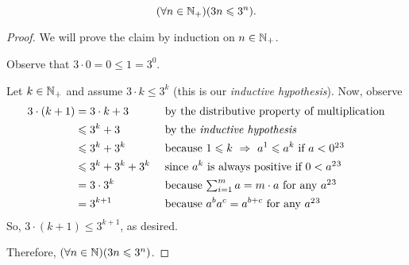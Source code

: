 \begin{theorem}\label{thm:gaussiansum}
    \[
        \pn*{\forall n \in \N_+}\pn*{3n \leq 3^n}.
    \]
\end{theorem}
\begin{proof}
    We will prove the claim by induction on $n \in \mathbb{N}_+$.

    \begin{case}
        Observe that $3 \cdot 0 = 0 \leq 1 = 3^0$.
    \end{case}

    \begin{case}
        Let $k \in \mathbb{N}_+$ and assume $3 \cdot k \leq 3^k$
        (this is our \emph{inductive hypothesis}).
        Now, observe
        \begin{alignat*}{2}
            3 \cdot (k + 1) &= 3 \cdot k + 3 &&\text{ by the distributive property of multiplication} \\
                            &\leq 3^k + 3 &&\text{ by the \emph{inductive hypothesis}} \\
                            &\leq 3^k + 3^k &&\text{ because $1 \leq k \implies a^1 \leq a^k$ if $a < 0$}\footnotemark[2]\footnotemark[3] \\
                            &\leq 3^k + 3^k + 3^k &&\text{ since $a^k$ is always positive if $0 < a$}\footnotemark[2]\footnotemark[3] \\
                            &= 3 \cdot 3^k &&\text{ because $\textstyle \sum_{i = 1}^{m}a = m \cdot a$ for any $a$}\footnotemark[2]\footnotemark[3] \\
                            &= 3^{k + 1} &&\text{ because $a^ba^c = a^{b + c}$ for any $a$}\footnotemark[2]\footnotemark[3]
        \end{alignat*}
        So, $3 \cdot (k + 1) \leq 3^{k + 1}$, as desired.
    \end{case}
    Therefore, $\pn*{\forall n \in \N}\pn*{3n \leq 3^n}$.
\end{proof}



